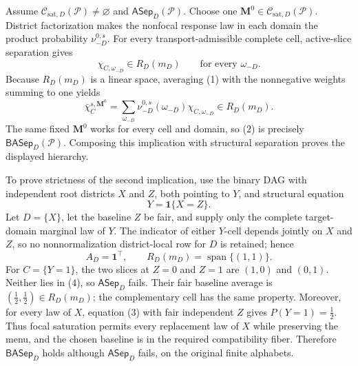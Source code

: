 Assume \(\mathcal C_{\mathrm{sat},D}(\mathcal P)\ne\varnothing\) and \(\mathsf{ASep}_D(\mathcal P)\). Choose one
\(\mathbf M^0\in\mathcal C_{\mathrm{sat},D}(\mathcal P)\). District factorization makes the nonfocal response law in each domain the product probability \(\nu_{-D}^{0,s}\). For every transport-admissible complete cell, active-slice separation gives
\[
\chi_{C,\omega_{-D}}\in R_D(m_D)\qquad\text{for every }\omega_{-D}.\tag{1}
\]
Because \(R_D(m_D)\) is a linear space, averaging (1) with the nonnegative weights summing to one yields
\[
\bar\chi_C^{s,\mathbf M^0}
=\sum_{\omega_{-D}}\nu_{-D}^{0,s}(\omega_{-D})\chi_{C,\omega_{-D}}
\in R_D(m_D).\tag{2}
\]
The same fixed \(\mathbf M^0\) works for every cell and domain, so (2) is precisely \(\mathsf{BASep}_D(\mathcal P)\). Composing this implication with structural separation proves the displayed hierarchy.

To prove strictness of the second implication, use the binary DAG with independent root districts \(X\) and \(Z\), both pointing to \(Y\), and structural equation
\[
Y=\mathbf1\{X=Z\}.\tag{3}
\]
Let \(D=\{X\}\), let the baseline \(Z\) be fair, and supply only the complete target-domain marginal law of \(Y\). The indicator of either \(Y\)-cell depends jointly on \(X\) and \(Z\), so no nonnormalization district-local row for \(D\) is retained; hence
\[
A_D=\mathbf1^\top,\qquad R_D(m_D)=\operatorname{span}\{(1,1)\}.\tag{4}
\]
For \(C=\{Y=1\}\), the two slices at \(Z=0\) and \(Z=1\) are \((1,0)\) and \((0,1)\). Neither lies in (4), so \(\mathsf{ASep}_D\) fails. Their fair baseline average is
\((\tfrac12,\tfrac12)\in R_D(m_D)\); the complementary cell has the same property. Moreover, for every law of \(X\), equation (3) with fair independent \(Z\) gives \(P(Y=1)=\tfrac12\). Thus focal saturation permits every replacement law of \(X\) while preserving the menu, and the chosen baseline is in the required compatibility fiber. Therefore \(\mathsf{BASep}_D\) holds although \(\mathsf{ASep}_D\) fails, on the original finite alphabets.